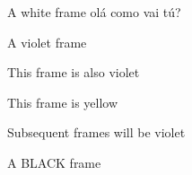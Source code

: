 \documentclass{beamer}
\begin{document}
\begin{frame}{A white frame}
\centering olá como vai tú?
\end{frame}

\begin{frame}{A violet frame}
\end{frame}

\begin{frame}{This frame is also violet}
\end{frame}


{
\begin{frame}{This frame is yellow}
\end{frame}
}

\begin{frame}{Subsequent frames will be violet}
\end{frame}

\begin{frame}{\color{white}A BLACK frame}
\end{frame}
\end{document}
